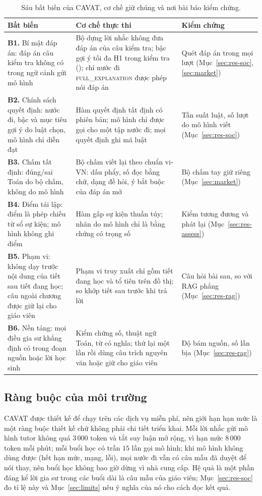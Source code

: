 \begin{table}[tp]
\centering
\caption{Sáu bất biến của CAVAT, cơ chế giữ chúng và nơi bài báo kiểm chứng.}
\label{tab:invariants}
\small
\begin{tabularx}{\linewidth}{@{}>{\raggedright\arraybackslash}p{2.7cm}YY@{}}
\toprule
Bất biến & Cơ chế thực thi & Kiểm chứng \\
\midrule
\textbf{B1.} Bí mật đáp án: đáp án câu kiểm tra không có trong ngữ cảnh gửi mô hình & Bộ dựng lời nhắc không đưa đáp án của câu kiểm tra; bậc gợi ý tối đa H1 trong kiểm tra (); chỉ nước đi \textsc{full\_explanation} được phép nói đáp án & Quét đáp án trong mọi lượt (Mục~\ref{sec:res-soc}, \ref{sec:market}) \\
\textbf{B2.} Chính sách quyết định: nước đi, bậc và mục tiêu gợi ý do luật chọn, mô hình chỉ diễn đạt & Hàm quyết định tất định có phiên bản; mô hình chỉ được gọi cho một tập nước đi; mọi quyết định ghi mã luật & Tần suất luật, số lượt do mô hình viết (Mục~\ref{sec:res-soc}) \\
\textbf{B3.} Chấm tất định: đúng/sai Toán do bộ chấm, không do mô hình & Bộ chấm viết lại theo chuẩn vi-VN: dấu phẩy, số đọc bằng chữ, dạng đề hỏi, ý bắt buộc của đáp án mở & Bộ chấm tay giữ riêng (Mục~\ref{sec:market}) \\
\textbf{B4.} Điểm tái lập: điểm là phép chiếu từ sổ sự kiện; mô hình không ghi điểm & Hàm gấp sự kiện thuần túy; nhãn do mô hình chỉ là bằng chứng có trọng số & Kiểm tương đương và phát lại (Mục~\ref{sec:res-assess}) \\
\textbf{B5.} Phạm vi: không dạy trước nội dung của tiết sau tiết đang học; câu ngoài chương được giữ lại cho giáo viên & Phạm vi truy xuất chỉ gồm tiết đang học và tổ tiên trên đồ thị; so khớp tiết sau trước khi trả lời & Câu hỏi bài sau, so với RAG phẳng (Mục~\ref{sec:res-rag}) \\
\textbf{B6.} Nền tảng: mọi điều gia sư khẳng định có trong đoạn nguồn hoặc lời học sinh & Kiểm chứng số, thuật ngữ Toán, từ có nghĩa; thử lại một lần rồi dùng câu trích nguyên văn hoặc giữ cho giáo viên & Độ bám nguồn, số lần bịa (Mục~\ref{sec:res-rag}) \\
\bottomrule
\end{tabularx}
\end{table}

\subsection{Ràng buộc của môi trường}
CAVAT được thiết kế để chạy trên các dịch vụ miễn phí, nên giới hạn hạn mức là một ràng buộc thiết kế chứ không phải chi tiết triển khai. Mỗi lời nhắc gửi mô hình tutor không quá $3\,000$ token và tắt suy luận mở rộng, vì hạn mức $8\,000$ token mỗi phút; mỗi buổi học có trần $15$ lần gọi mô hình; khi mô hình không dùng được (hết hạn mức, mạng, lỗi), mọi nước đi vẫn có câu mẫu đã duyệt để nói thay, nên buổi học không bao giờ dừng vì nhà cung cấp. Hệ quả là một phần đáng kể lời gia sư trong các buổi dài là câu mẫu của giáo viên; Mục~\ref{sec:res-soc} đo tỉ lệ này và Mục~\ref{sec:limits} nêu ý nghĩa của nó cho cách đọc kết quả.
